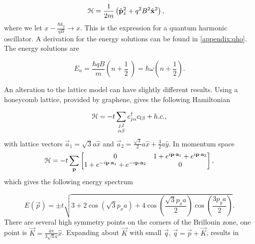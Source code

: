 \begin{align}
  \ham & = \dfrac{1}{2m} \left( \op{p}_x^2 + q^2 B^2 \op{x}^2 \right),
\end{align}
where we let $x - \tfrac{\hbar k_y}{qB} \rightarrow x$.
This is the expression for a quantum harmonic oscillator.
A derivation for the energy solutions can be found in \ref{appendix:qho}.
The energy solutions are

\begin{equation}
  E_n = \dfrac{\hbar q B}{m} \left(n+\dfrac{1}{2}\ \right) = \hbar \omega \left(n + \dfrac{1}{2} \right).
\end{equation}

An alteration to the lattice model can have slightly different results.
Using a honeycomb lattice, provided by graphene, gives the following Hamiltonian

\begin{equation}
  \mathcal{H} = -t \sum_{\substack{j, l \\ \alpha \beta}} c^{\dagger}_{j\alpha} c_{l\beta} + h.c.,
\end{equation}
with lattice vectors $\vec{a}_1 = \sqrt{3} a \hat{x}$ and $\vec{a}_2 = \tfrac{\sqrt{3}}{2} a \hat{x} + \tfrac{3}{2} a \hat{y}$.
In momentum space
\[
  \mathcal{H} = -t \sum_{\mathbf{p}}
  \begin{bmatrix}
    0 & 1 + e^{i\mathbf{p}\cdot \mathbf{a}_1 } + e^{i \mathbf{p}\cdot \mathbf{a}_2} \\
    1 + e^{-i\mathbf{p}\cdot \mathbf{a}_1 } + e^{-i \mathbf{p}\cdot \mathbf{a}_2} & 0
  \end{bmatrix},
\]
%
which gives the following energy spectrum

\begin{equation}
  E(\vec{p}) = \pm t \sqrt{3 + 2\cos{\left(\sqrt{3}p_x a\right)} + 4\cos{\left(\dfrac{\sqrt{3}p_x a}{2}\right)}\cos{\left(\dfrac{3p_y a}{2}\right)} }.
\end{equation}
There are several high symmetry points on the corners of the Brillouin zone, one point is $\vec{K} = \tfrac{4\pi}{3\sqrt{3}a} \hat{x}$.
Expanding about $\vec{K}$ with small $\vec{q}$, $\vec{q} = \vec{p} + \vec{K}$, results in


